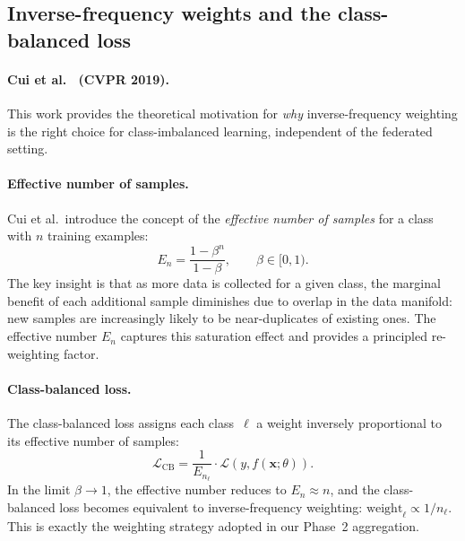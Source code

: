 \documentclass[runningheads]{llncs}
\begin{document}
\subsection{Inverse-frequency weights and the class-balanced loss}\label{app:cui}

\paragraph{Cui et al.~\cite{ref_cui2019} (CVPR 2019).}
This work provides the theoretical motivation for \emph{why} inverse-frequency weighting is the right choice for class-imbalanced learning, independent of the federated setting.

\paragraph{Effective number of samples.}
Cui et al.\ introduce the concept of the \emph{effective number of samples} for a class with $n$ training examples:
\[
E_n = \frac{1-\beta^n}{1-\beta},
\qquad \beta\in[0,1).
\]
The key insight is that as more data is collected for a given class, the marginal benefit of each additional sample diminishes due to overlap in the data manifold: new samples are increasingly likely to be near-duplicates of existing ones.
The effective number $E_n$ captures this saturation effect and provides a principled re-weighting factor.

\paragraph{Class-balanced loss.}
The class-balanced loss assigns each class~$\ell$ a weight inversely proportional to its effective number of samples:
\[
\mathcal{L}_{\text{CB}} = \frac{1}{E_{n_\ell}} \cdot \mathcal{L}(y, f(\mathbf{x};\theta)).
\]
In the limit $\beta\to 1$, the effective number reduces to $E_n\approx n$, and the class-balanced loss becomes equivalent to inverse-frequency weighting: $\text{weight}_\ell\propto 1/n_\ell$.
This is exactly the weighting strategy adopted in our Phase~2 aggregation.
\end{document}
